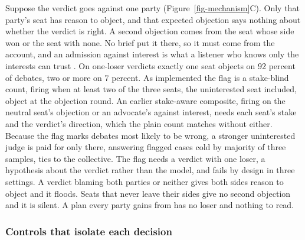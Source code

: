 Suppose the verdict goes against one party (Figure~\ref{fig-mechanism}C).
Only that party's seat has reason to object, and that expected objection
says nothing about whether the verdict is right. A second objection comes
from the seat whose side won or the seat with none. No brief put it there,
so it must come from the account, and an admission against interest is
what a listener who knows only the interests can trust
\citep{milgrom1986relying,lipman1995robust}.
On one-loser verdicts exactly one seat objects on 92 percent of debates,
two or more on 7
percent.
As implemented the flag is a stake-blind count, firing when at least two
of the three seats, the uninterested seat included, object at the
objection round.
An earlier stake-aware composite, firing on the neutral seat's objection
or an advocate's against interest, needs each seat's stake and the
verdict's direction, which the plain count matches without
either.
Because the flag marks debates most likely to be wrong, a stronger
uninterested judge is paid for only there, answering flagged cases cold
by majority of three samples, ties to the
collective.
The flag needs a verdict with one loser, a hypothesis about the verdict
rather than the model, and fails by design in three settings. A verdict
blaming both parties or neither gives both sides reason to object and it
floods. Seats that never leave their sides give no second objection and
it is silent. A plan every party gains from has no loser and nothing to
read.

\subsubsection{Controls that isolate each decision}
\label{sec-method-controls}
\label{sec-method-designs}

